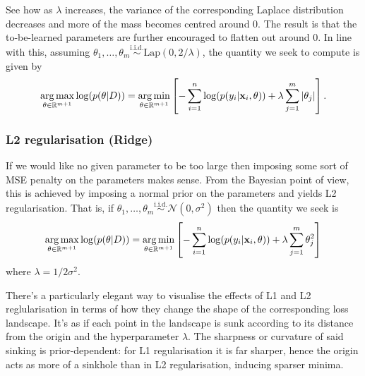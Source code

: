 \documentclass[11pt]{article}
\begin{document}
See how as $\lambda$ increases, the variance of the corresponding Laplace distribution decreases and more of the mass becomes centred around 0. The result is that the to-be-learned parameters are further encouraged to flatten out around 0. In line with this, assuming $\theta_1,\dots,\theta_m\overset{\text{i.i.d.}}{\sim}\text{Lap}(0, 2/\lambda)$, the quantity we seek to compute is given by
$$
\operatorname*{arg\,max}_{\theta\in\mathbb{R}^{m+1}}\log(p(\theta|D))
=
\operatorname*{arg\,min}_{\theta\in\mathbb{R}^{m+1}}\left[-\sum_{i=1}^n\log(p(y_i|\mathbf{x}_i,\theta))+\lambda\sum_{j=1}^m|\theta_j|\right].
$$

\subsubsection{L2 regularisation (Ridge)}
If we would like no given parameter to be too large then imposing some sort of MSE penalty on the parameters makes sense. From the Bayesian point of view, this is achieved by imposing a normal prior on the parameters and yields L2 regularisation. That is, if $\theta_1,\dots,\theta_m\overset{\text{i.i.d.}}{\sim}\mathcal{N}(0,\sigma^2)$ then the quantity we seek is
$$
\operatorname*{arg\,max}_{\theta\in\mathbb{R}^{m+1}}\log(p(\theta|D))
=
\operatorname*{arg\,min}_{\theta\in\mathbb{R}^{m+1}}\left[-\sum_{i=1}^n\log(p(y_i|\mathbf{x}_i,\theta))+\lambda\sum_{j=1}^m \theta_j^2\right]
$$
where $\lambda=1/2\sigma^2$.

There's a particularly elegant way to visualise the effects of L1 and L2 reglularisation in terms of how they change the shape of the corresponding loss landscape. It's as if each point in the landscape is sunk according to its distance from the origin and the hyperparameter $\lambda$. The sharpness or curvature of said sinking is prior-dependent: for L1 regularisation it is far sharper, hence the origin acts as more of a sinkhole than in L2 regularisation, inducing sparser minima.
\end{document}
